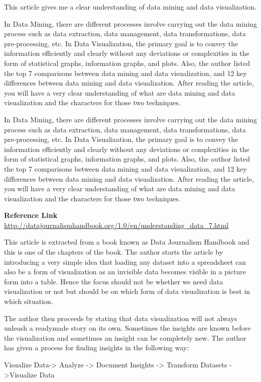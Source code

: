 \documentclass[]{book}
\theoremstyle{definition}
\theoremstyle{definition}
\theoremstyle{definition}
\theoremstyle{remark}
\begin{document}
This article gives me a clear understanding of data mining and data
visualization.

In Data Mining, there are different processes involve carrying out the
data mining process such as data extraction, data management, data
transformations, data pre-processing, etc. In Data Visualization, the
primary goal is to convey the information efficiently and clearly
without any deviations or complexities in the form of statistical
graphs, information graphs, and plots. Also, the author listed the top 7
comparisons between data mining and data visualization, and 12 key
differences between data mining and data visualization. After reading
the article, you will have a very clear understanding of what are data
mining and data visualization and the characters for those two
techniques.

In Data Mining, there are different processes involve carrying out the
data mining process such as data extraction, data management, data
transformations, data pre-processing, etc. In Data Visualization, the
primary goal is to convey the information efficiently and clearly
without any deviations or complexities in the form of statistical
graphs, information graphs, and plots. Also, the author listed the top 7
comparisons between data mining and data visualization, and 12 key
differences between data mining and data visualization. After reading
the article, you will have a very clear understanding of what are data
mining and data visualization and the characters for those two
techniques.

\textbf{Reference Link}
\url{http://datajournalismhandbook.org/1.0/en/understanding_data_7.html}

This article is extracted from a book known as Data Journalism Handbook
and this is one of the chapters of the book. The author starts the
article by introducing a very simple idea that loading any dataset into
a spreadsheet can also be a form of visualization as an invisible data
becomes visible in a picture form into a table. Hence the focus should
not be whether we need data visualization or not but should be on which
form of data visualization is best in which situation.

The author then proceeds by stating that data visualization will not
always unleash a readymade story on its own. Sometimes the insights are
known before the visualization and sometimes an insight can be
completely new. The author has given a process for finding insights in
the following way:

Visualize Data-\textgreater{} Analyze -\textgreater{} Document Insights
-\textgreater{} Transform Datasets -\textgreater{}Visualize Data
\end{document}
